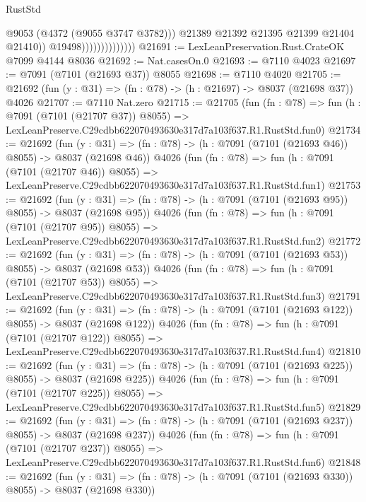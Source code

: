 \begin{lexlean}{RustStd}
\begin{coremodule}
                                      @9053
                                      (@4372 (@9055 @3747 @3782)))
                                    @21389
                                    @21392
                                    @21395
                                    @21399
                                    @21404
                                    @21410))
                                @19498))))))))))))))
@21691 := LexLeanPreservation.Rust.CrateOK @7099 @4144 @8036
@21692 := Nat.casesOn.{0}
@21693 := @7110 @4023
@21697 := @7091 (@7101 (@21693 @37)) @8055
@21698 := @7110 @4020
@21705 := @21692 (fun (y : @31) => (fn : @78) -> (h : @21697) -> @8037 (@21698 @37)) @4026
@21707 := @7110 Nat.zero
@21715 := @21705
    (fun (fn : @78) =>
    fun (h : @7091 (@7101 (@21707 @37)) @8055) =>
    LexLeanPreserve.C29cdbb622070493630e317d7a103f637.R1.RustStd.fun0)
@21734 := @21692
    (fun (y : @31) => (fn : @78) -> (h : @7091 (@7101 (@21693 @46)) @8055) -> @8037 (@21698 @46))
    @4026
    (fun (fn : @78) =>
    fun (h : @7091 (@7101 (@21707 @46)) @8055) =>
    LexLeanPreserve.C29cdbb622070493630e317d7a103f637.R1.RustStd.fun1)
@21753 := @21692
    (fun (y : @31) => (fn : @78) -> (h : @7091 (@7101 (@21693 @95)) @8055) -> @8037 (@21698 @95))
    @4026
    (fun (fn : @78) =>
    fun (h : @7091 (@7101 (@21707 @95)) @8055) =>
    LexLeanPreserve.C29cdbb622070493630e317d7a103f637.R1.RustStd.fun2)
@21772 := @21692
    (fun (y : @31) => (fn : @78) -> (h : @7091 (@7101 (@21693 @53)) @8055) -> @8037 (@21698 @53))
    @4026
    (fun (fn : @78) =>
    fun (h : @7091 (@7101 (@21707 @53)) @8055) =>
    LexLeanPreserve.C29cdbb622070493630e317d7a103f637.R1.RustStd.fun3)
@21791 := @21692
    (fun (y : @31) => (fn : @78) -> (h : @7091 (@7101 (@21693 @122)) @8055) -> @8037 (@21698 @122))
    @4026
    (fun (fn : @78) =>
    fun (h : @7091 (@7101 (@21707 @122)) @8055) =>
    LexLeanPreserve.C29cdbb622070493630e317d7a103f637.R1.RustStd.fun4)
@21810 := @21692
    (fun (y : @31) => (fn : @78) -> (h : @7091 (@7101 (@21693 @225)) @8055) -> @8037 (@21698 @225))
    @4026
    (fun (fn : @78) =>
    fun (h : @7091 (@7101 (@21707 @225)) @8055) =>
    LexLeanPreserve.C29cdbb622070493630e317d7a103f637.R1.RustStd.fun5)
@21829 := @21692
    (fun (y : @31) => (fn : @78) -> (h : @7091 (@7101 (@21693 @237)) @8055) -> @8037 (@21698 @237))
    @4026
    (fun (fn : @78) =>
    fun (h : @7091 (@7101 (@21707 @237)) @8055) =>
    LexLeanPreserve.C29cdbb622070493630e317d7a103f637.R1.RustStd.fun6)
@21848 := @21692
    (fun (y : @31) => (fn : @78) -> (h : @7091 (@7101 (@21693 @330)) @8055) -> @8037 (@21698 @330))

\end{coremodule}
\end{lexlean}
